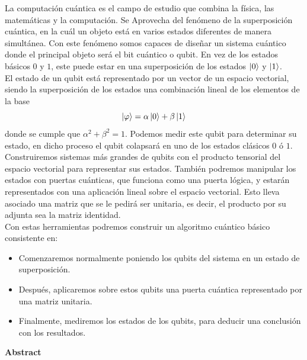 \documentclass[a4paper]{article}
\numberwithin{equation}{section}
\begin{document}
La computación cuántica es el campo de estudio que combina la física, las matemáticas y la computación. Se Aprovecha del fenómeno de la superposición cuántica, en la cuál un objeto está en varios estados diferentes de manera simultánea. Con este fenómeno somos capaces de diseñar un sistema cuántico donde el principal objeto será el bit cuántico o qubit. En vez de los estados básicos $0$ y $1$, este puede estar en una superposición de los estados $\ket{0}$ y $\ket{1}$.\\
El estado de un qubit está representado por un vector de un espacio vectorial, siendo la superposición de los estados una combinación lineal de los elementos de la base
\begin{equation}
\ket{\varphi} = \alpha \ket{0} + \beta \ket{1}
\end{equation}
donde se cumple que $\alpha^2 + \beta^2 = 1$. Podemos medir este qubit para determinar su estado, en dicho proceso el qubit colapsará en uno de los estados clásicos $0$ ó $1$.\\
Construiremos sistemas más grandes de qubits con el producto tensorial del espacio vectorial para representar sus estados. También podremos manipular los estados con puertas cuánticas, que funciona como una puerta lógica, y estarán representados con una aplicación lineal sobre el espacio vectorial. Esto lleva asociado una matriz que se le pedirá ser unitaria, es decir, el producto por su adjunta sea la matriz identidad.\\
\linebreak
Con estas herramientas podremos construir un algoritmo cuántico básico consistente en:
\begin{itemize}
\item Comenzaremos normalmente poniendo los qubits del sistema en un estado de superposición.

\item Después, aplicaremos sobre estos qubits una puerta cuántica representado por una matriz unitaria.

\item Finalmente, mediremos los estados de los qubits, para deducir una conclusión con los resultados.
\end{itemize}

\begin{center}
\textbf{\Large Abstract}
\end{center}
\vspace{0.5cm}
\end{document}
